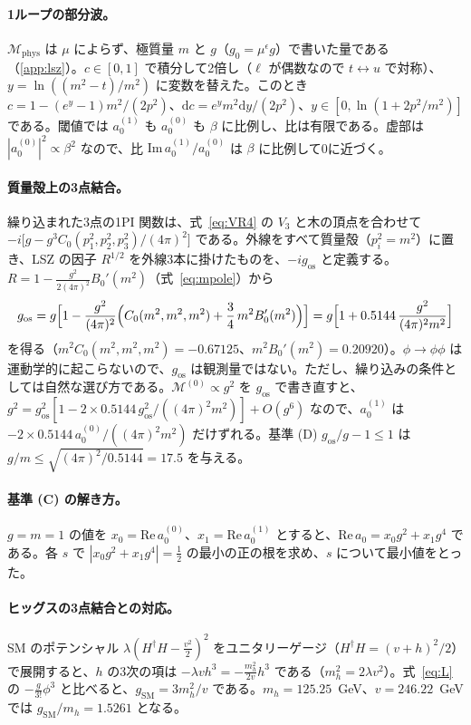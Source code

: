 \documentclass[a4paper,10pt]{ltjsarticle}
\newcommand{\dd}{\mathrm{d}}
\begin{document}
\paragraph{1ループの部分波。}$\mathcal{M}_{\mathrm{phys}}$ は $\mu$ によらず、極質量 $m$ と $g$（$g_0=\mu^\epsilon g$）で書いた量である（\ref{app:lsz}）。$c\in[0,1]$ で積分して2倍し（$\ell$ が偶数なので $t\leftrightarrow u$ で対称）、$y=\ln((m^2-t)/m^2)$ に変数を替えた。このとき $c=1-(e^y-1)m^2/(2p^2)$、$\dd c=e^ym^2\dd y/(2p^2)$、$y\in[0,\ln(1+2p^2/m^2)]$ である。閾値では $a_0^{(1)}$ も $a_0^{(0)}$ も $\beta$ に比例し、比は有限である。虚部は $|a_0^{(0)}|^2\propto\beta^2$ なので、比 $\mathrm{Im}\,a_0^{(1)}/a_0^{(0)}$ は $\beta$ に比例して0に近づく。

\paragraph{質量殻上の3点結合。}繰り込まれた3点の1PI 関数は、式~\eqref{eq:VR4} の $V_3$ と木の頂点を合わせて $-i\bigl[g-g^3C_0(p_1^2,p_2^2,p_3^2)/(4\pi)^2\bigr]$ である。外線をすべて質量殻（$p_i^2=m^2$）に置き、LSZ の因子 $R^{1/2}$ を外線3本に掛けたものを、$-ig_{\mathrm{os}}$ と定義する。$R=1-\frac{g^2}{2(4\pi)^2}B_0'(m^2)$（式~\eqref{eq:mpole}）から
\begin{equation*}
g_{\mathrm{os}}=g\Bigl[1-\frac{g^2}{(4\pi)^2}\Bigl(C_0(m^2,m^2,m^2)+\frac34\,m^2B_0'(m^2)\Bigr)\Bigr]=g\Bigl[1+0.5144\,\frac{g^2}{(4\pi)^2m^2}\Bigr]
\end{equation*}
を得る（$m^2C_0(m^2,m^2,m^2)=-0.67125$、$m^2B_0'(m^2)=0.20920$）。$\phi\to\phi\phi$ は運動学的に起こらないので、$g_{\mathrm{os}}$ は観測量ではない。ただし、繰り込みの条件としては自然な選び方である。$\mathcal{M}^{(0)}\propto g^2$ を $g_{\mathrm{os}}$ で書き直すと、$g^2=g_{\mathrm{os}}^2[1-2\times0.5144\,g_{\mathrm{os}}^2/((4\pi)^2m^2)]+O(g^6)$ なので、$a_0^{(1)}$ は $-2\times0.5144\,a_0^{(0)}/((4\pi)^2m^2)$ だけずれる。基準 (D) $g_{\mathrm{os}}/g-1\le1$ は $g/m\le\sqrt{(4\pi)^2/0.5144}=17.5$ を与える。

\paragraph{基準 (C) の解き方。}$g=m=1$ の値を $x_0=\mathrm{Re}\,a_0^{(0)}$、$x_1=\mathrm{Re}\,a_0^{(1)}$ とすると、$\mathrm{Re}\,a_0=x_0g^2+x_1g^4$ である。各 $s$ で $|x_0g^2+x_1g^4|=\frac12$ の最小の正の根を求め、$s$ について最小値をとった。

\paragraph{ヒッグスの3点結合との対応。}SM のポテンシャル $\lambda(H^\dagger H-\frac{v^2}{2})^2$ をユニタリーゲージ（$H^\dagger H=(v+h)^2/2$）で展開すると、$h$ の3次の項は $-\lambda vh^3=-\frac{m_h^2}{2v}h^3$ である（$m_h^2=2\lambda v^2$）。式~\eqref{eq:L} の $-\frac{g}{3!}\phi^3$ と比べると、$g_{\mathrm{SM}}=3m_h^2/v$ である。$m_h=125.25$~GeV、$v=246.22$~GeV では $g_{\mathrm{SM}}/m_h=1.5261$ となる。
\end{document}
